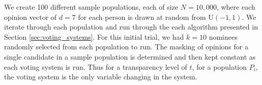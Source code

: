 
We create 100 different sample populations, each of size $N = 10,000$, where each opinion vector of $d=7$ for each person is drawn at random from U$(-1,1)$.
We iterate through each population and run through the each algorithm presented in Section \ref{sec:voting_systems}.
For this initial trial, we had $k=10$ nominees randomly selected from each population to run.
The masking of opinions for a single candidate in a sample population is determined and then kept constant as each voting system is run.
Thus for a transparency level of $t$, for a population $P_i$, the voting system is the only variable changing in the system.
